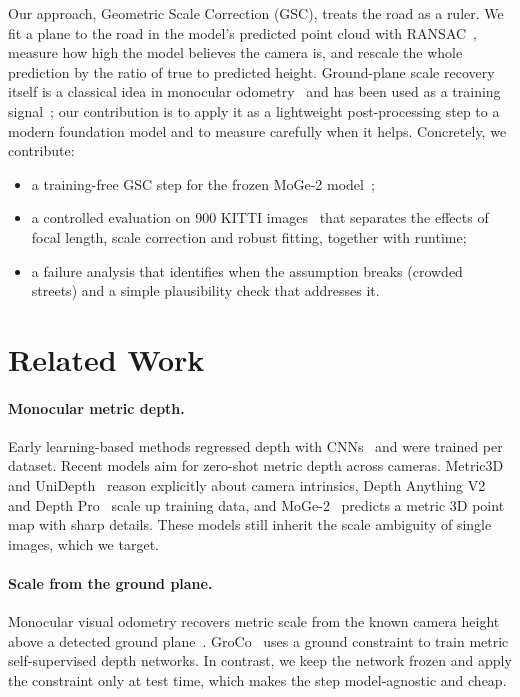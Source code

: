 \documentclass[10pt,twocolumn,letterpaper]{article}
\begin{document}
Our approach, Geometric Scale Correction (GSC), treats the road as a ruler. We fit a plane to the road
in the model's predicted point cloud with RANSAC~\cite{fischler1981ransac}, measure how high the model
believes the camera is, and rescale the whole prediction by the ratio of true to predicted height.
Ground-plane scale recovery itself is a classical idea in monocular odometry~\cite{song2014robust} and
has been used as a training signal~\cite{cecille2024groco}; our contribution is to apply it as a
lightweight post-processing step to a modern foundation model and to measure carefully when it helps.
Concretely, we contribute:
\begin{itemize}
  \item a training-free GSC step for the frozen MoGe-2 model~\cite{wang2025moge2};
  \item a controlled evaluation on 900 KITTI images~\cite{geiger2012kitti,uhrig2017sparsity} that
  separates the effects of focal length, scale correction and robust fitting, together with runtime;
  \item a failure analysis that identifies when the assumption breaks (crowded streets) and a simple
  plausibility check that addresses it.
\end{itemize}

\section{Related Work}
\label{sec:related}

\paragraph{Monocular metric depth.}
Early learning-based methods regressed depth with CNNs~\cite{eigen2014depth} and were trained per
dataset. Recent models aim for zero-shot metric depth across cameras. Metric3D~\cite{yin2023metric3d}
and UniDepth~\cite{piccinelli2024unidepth} reason explicitly about camera intrinsics, Depth Anything
V2~\cite{yang2024dav2} and Depth Pro~\cite{bochkovskii2025depthpro} scale up training data, and
MoGe-2~\cite{wang2025moge2} predicts a metric 3D point map with sharp details. These models still
inherit the scale ambiguity of single images, which we target.

\paragraph{Scale from the ground plane.}
Monocular visual odometry recovers metric scale from the known camera height above a detected ground
plane~\cite{song2014robust}. GroCo~\cite{cecille2024groco} uses a ground constraint to train metric
self-supervised depth networks. In contrast, we keep the network frozen and apply the constraint only
at test time, which makes the step model-agnostic and cheap.
\end{document}
